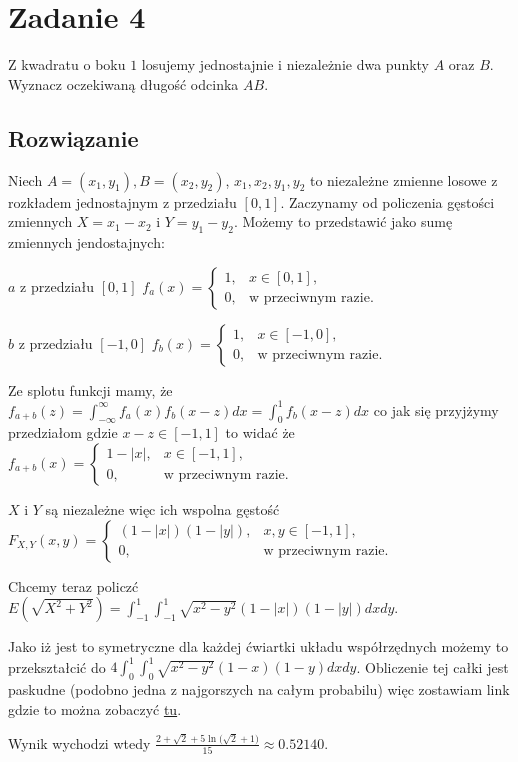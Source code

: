 \section{Zadanie 4}

Z kwadratu o boku \(1\) losujemy jednostajnie i niezależnie dwa punkty \(A\) oraz \(B\). Wyznacz oczekiwaną długość odcinka \(AB\).

\subsection*{Rozwiązanie}

Niech \(A = (x_1, y_1), B= (x_2, y_2)\), \(x_1, x_2, y_1, y_2\) to niezależne zmienne losowe z rozkładem jednostajnym z przedziału \([0, 1]\). Zaczynamy od policzenia gęstości zmiennych  \(X = x_1 - x_2\) i \(Y = y_1 - y_2\). Możemy to przedstawić jako sumę zmiennych jendostajnych:

\(a\) z przedziału \([0,1]\) \(f_a(x) =
\begin{cases}
	1, & x \in [0,1],               \\
	0, & \text{w przeciwnym razie}.
\end{cases}\)

\(b\) z przedziału \([-1,0]\) \(f_b(x) =
\begin{cases}
	1, & x \in [-1,0],              \\
	0, & \text{w przeciwnym razie}.
\end{cases}\)

Ze splotu funkcji mamy, że \(f_{a + b}(z) = \int_{-\infty}^{\infty}f_a(x)f_b(x - z)dx = \int_{0}^1 f_b(x-z)dx\) co jak się przyjżymy przedziałom gdzie \(x - z \in [-1, 1]\) to widać że \(f_{a + b}(x) =
\begin{cases}
	1 - |x|, & x \in [-1,1],              \\
	0,       & \text{w przeciwnym razie}.
\end{cases}
\)

\(X\) i \(Y\) są niezależne więc ich wspolna gęstość \(F_{X,Y}(x, y) =
\begin{cases}
	(1 - |x|)(1 - |y|), & x, y \in [-1,1],           \\
	0,                  & \text{w przeciwnym razie}.
\end{cases}\)

Chcemy teraz policzć \(E(\sqrt{X^2 + Y^2}) = \int_{-1}^{1} \int_{-1}^1 \sqrt{x^2 - y^2}(1 - |x|)(1 - |y|)dxdy\).

Jako iż jest to symetryczne dla każdej ćwiartki układu współrzędnych możemy to przekształcić do \(4 \int_{0}^{1} \int_{0}^1 \sqrt{x^2 - y^2}(1 - x)(1 - y)dxdy\). Obliczenie tej całki jest paskudne (podobno jedna z najgorszych na całym probabilu) więc zostawiam link gdzie to można zobaczyć \href{https://mindyourdecisions.com/blog/2016/07/03/distance-between-two-random-points-in-a-square-sunday-puzzle/}{ tu}.

Wynik wychodzi wtedy \(\frac{2 + \sqrt{2} + 5\ln{(\sqrt{2} + 1})}{15} \approx 0.52140\).




